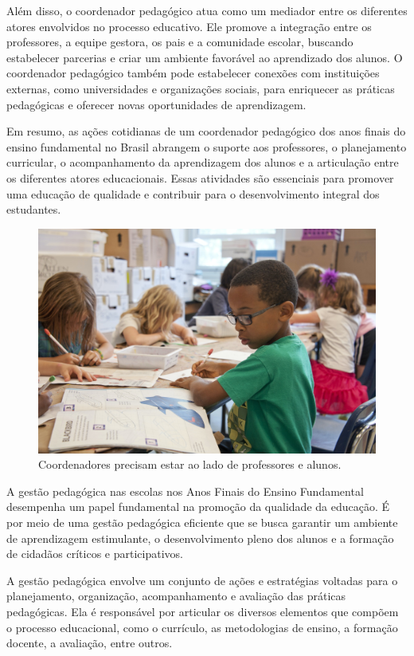 Além disso, o coordenador pedagógico atua como um mediador entre os diferentes atores envolvidos no processo educativo. Ele promove a integração entre os professores, a equipe gestora, os pais e a comunidade escolar, buscando estabelecer parcerias e criar um ambiente favorável ao aprendizado dos alunos. O coordenador pedagógico também pode estabelecer conexões com instituições externas, como universidades e organizações sociais, para enriquecer as práticas pedagógicas e oferecer novas oportunidades de aprendizagem.

Em resumo, as ações cotidianas de um coordenador pedagógico dos anos finais do ensino fundamental no Brasil abrangem o suporte aos professores, o planejamento curricular, o acompanhamento da aprendizagem dos alunos e a articulação entre os diferentes atores educacionais. Essas atividades são essenciais para promover uma educação de qualidade e contribuir para o desenvolvimento integral dos estudantes.

\begin{figure}
\centering
\includegraphics[width=\textwidth]{./imgs/Imagem004.jpg}
\caption{Coordenadores precisam estar ao lado de professores e alunos.}
\end{figure}

A gestão pedagógica nas escolas nos Anos Finais do Ensino Fundamental
desempenha um papel fundamental na promoção da qualidade da educação. É
por meio de uma gestão pedagógica eficiente que se busca garantir um
ambiente de aprendizagem estimulante, o desenvolvimento pleno dos alunos
e a formação de cidadãos críticos e participativos.

A gestão pedagógica envolve um conjunto de ações e estratégias voltadas
para o planejamento, organização, acompanhamento e avaliação das
práticas pedagógicas. Ela é responsável por articular os diversos
elementos que compõem o processo educacional, como o currículo, as
metodologias de ensino, a formação docente, a avaliação, entre outros.

